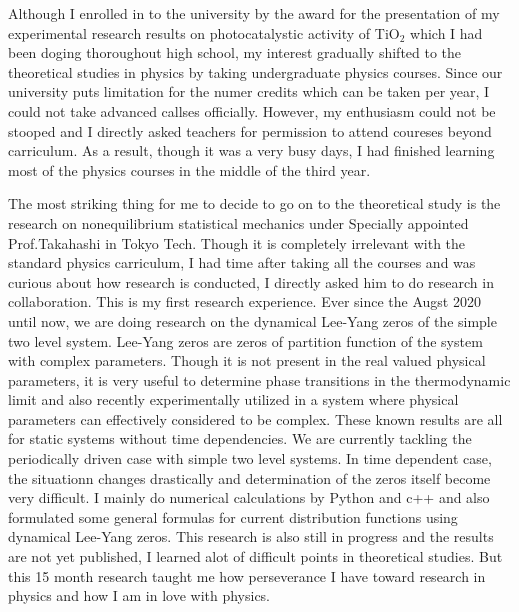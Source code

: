 \documentclass[a4]{article}
\begin{document}
Although I enrolled in to the university by the award for the presentation of my experimental research results on photocatalystic activity of TiO$_2$ which I had been doging thoroughout high school, my interest gradually shifted to the theoretical studies in physics by taking undergraduate physics courses. Since our university puts limitation for the numer credits which can be taken per year, I could not take advanced callses officially. However, my enthusiasm could not be stooped and I directly asked teachers for permission to attend coureses beyond carriculum. As a result, though it was a very busy days, I had finished learning most of the physics courses in the middle of the third year.\par
The most striking thing for me to decide to go on to the theoretical study is the research on nonequilibrium statistical mechanics under Specially appointed Prof.Takahashi in Tokyo Tech. Though it is completely irrelevant with the standard physics carriculum, I had time after taking all the courses and was curious about how research is conducted, I directly asked him to do research in collaboration. This is my first research experience. Ever since the Augst 2020 until now, we are doing research on the dynamical Lee-Yang zeros of the simple two level system. Lee-Yang zeros are zeros of partition function of the system with complex parameters. Though it is not present in the real valued physical parameters, it is very useful to determine phase transitions in the thermodynamic limit and also recently experimentally utilized in a system where physical parameters can effectively considered to be complex. These known results are all for static systems without time dependencies. We are currently tackling the periodically driven case with simple two level systems. In time dependent case, the situationn changes drastically and determination of the zeros itself become very difficult. I mainly do numerical calculations by Python and c++ and also formulated some general formulas for current distribution functions using dynamical Lee-Yang zeros. This research is also still in progress and the results are not yet published, I learned alot of difficult points in theoretical studies. But this 15 month research taught me how perseverance I have toward research in physics and how I am in love with physics.\par
\end{document}
